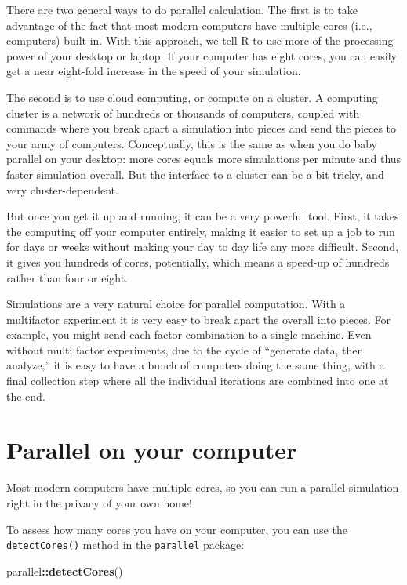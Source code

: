 \documentclass[
]{book}
\newenvironment{Shaded}{\begin{snugshade}}{\end{snugshade}}
\newcommand{\FunctionTok}[1]{\textcolor[rgb]{0.13,0.29,0.53}{\textbf{#1}}}
\newcommand{\NormalTok}[1]{#1}
\newcommand{\SpecialCharTok}[1]{\textcolor[rgb]{0.81,0.36,0.00}{\textbf{#1}}}
\begin{document}
There are two general ways to do parallel calculation.
The first is to take advantage of the fact that most modern computers have multiple cores (i.e., computers) built in.
With this approach, we tell R to use more of the processing power of your desktop or laptop.
If your computer has eight cores, you can easily get a near eight-fold increase in the speed of your simulation.

The second is to use cloud computing, or compute on a cluster.
A computing cluster is a network of hundreds or thousands of computers, coupled with commands where you break apart a simulation into pieces and send the pieces to your army of computers.
Conceptually, this is the same as when you do baby parallel on your desktop: more cores equals more simulations per minute and thus faster simulation overall.
But the interface to a cluster can be a bit tricky, and very cluster-dependent.

But once you get it up and running, it can be a very powerful tool.
First, it takes the computing off your computer entirely, making it easier to set up a job to run for days or weeks without making your day to day life any more difficult.
Second, it gives you hundreds of cores, potentially, which means a speed-up of hundreds rather than four or eight.

Simulations are a very natural choice for parallel computation.
With a multifactor experiment it is very easy to break apart the overall into pieces.
For example, you might send each factor combination to a single machine.
Even without multi factor experiments, due to the cycle of ``generate data, then analyze,'' it is easy to have a bunch of computers doing the same thing, with a final collection step where all the individual iterations are combined into one at the end.

\section{Parallel on your computer}\label{parallel-on-your-computer}

Most modern computers have multiple cores, so you can run a parallel simulation right in the privacy of your own home!

To assess how many cores you have on your computer, you can use the \texttt{detectCores()} method in the \texttt{parallel} package:

\begin{Shaded}
\begin{Highlighting}[]
\NormalTok{parallel}\SpecialCharTok{::}\FunctionTok{detectCores}\NormalTok{()}
\end{Highlighting}
\end{Shaded}
\end{document}
